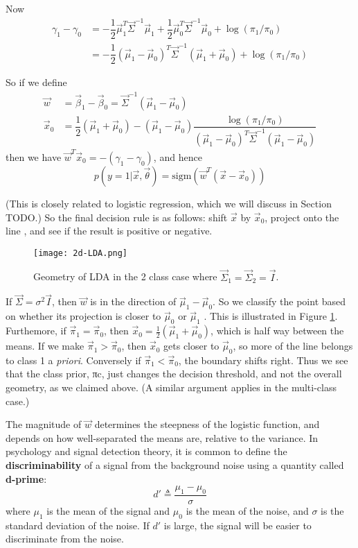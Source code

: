 Now
\begin{align}
\gamma_1-\gamma_0& = -\dfrac{1}{2}\vec{\mu}_1^T\vec{\Sigma}^{-1}\vec{\mu}_1+\dfrac{1}{2}\vec{\mu}_0^T\vec{\Sigma}^{-1}\vec{\mu}_0 + \log(\pi_1/\pi_0) \\
 & =-\dfrac{1}{2}(\vec{\mu}_1-\vec{\mu}_0)^T\vec{\Sigma}^{-1}(\vec{\mu}_1+\vec{\mu}_0)+ \log(\pi_1/\pi_0)
\end{align}

So if we define
\begin{align}
\vec{w}& =\vec{\beta}_1-\vec{\beta}_0=\vec{\Sigma}^{-1}(\vec{\mu}_1-\vec{\mu}_0) \\
\vec{x}_0& =\dfrac{1}{2}(\vec{\mu}_1+\vec{\mu}_0)-(\vec{\mu}_1-\vec{\mu}_0)\dfrac{\log(\pi_1/\pi_0)}{(\vec{\mu}_1-\vec{\mu}_0)^T\vec{\Sigma}^{-1}(\vec{\mu}_1-\vec{\mu}_0)}
\end{align}
then we have $\vec{w}^T\vec{x}_0=-(\gamma_1-\gamma_0)$, and hence
\begin{equation}
p(y=1|\vec{x},\vec{\theta})=\text{sigm}(\vec{w}^T(\vec{x}-\vec{x}_0))
\end{equation}

(This is closely related to logistic regression, which we will discuss in Section TODO.) So the final decision rule is as follows: shift $\vec{x}$ by $\vec{x}_0$, project onto the line , and see if the result is positive or negative.

\begin{figure}[hbtp]
\centering
    \texttt{[image: 2d-LDA.png]}
\caption{Geometry of LDA in the 2 class case where $\vec{\Sigma}_1=\vec{\Sigma}_2=\vec{I}$.}
\label{fig:2d-LDA} 
\end{figure}

If $\vec{\Sigma}=\sigma^2\vec{I}$, then $\vec{w}$ is in the direction of $\vec{\mu}_1-\vec{\mu}_0$. So we classify the point based on whether its projection is closer to $\vec{\mu}_0$ or $\vec{\mu}_1$ . This is illustrated in Figure \ref{fig:2d-LDA}. Furthemore, if $\vec{\pi}_1=\vec{\pi}_0$, then $\vec{x}_0=\frac{1}{2}(\vec{\mu}_1+\vec{\mu}_0)$, which is half way between the means. If we make $\vec{\pi}_1>\vec{\pi}_0$, then $\vec{x}_0$ gets closer to $\vec{\mu}_0$, so more of the line belongs to class 1 a \emph{priori}. Conversely if $\vec{\pi}_1<\vec{\pi}_0$, the boundary shifts right. Thus we see that the class prior, πc, just changes the decision threshold, and not the overall geometry, as we claimed above. (A similar argument applies in the multi-class case.)

The magnitude of $\vec{w}$ determines the steepness of the logistic function, and depends on how well-separated the means are, relative to the variance. In psychology and signal detection theory, it is common to define the \textbf{discriminability} of a signal from the background noise using a quantity called \textbf{d-prime}:
\begin{equation}
d' \triangleq \dfrac{\mu_1-\mu_0}{\sigma}
\end{equation}
where $\mu_1$ is the mean of the signal and $\mu_0$ is the mean of the noise, and $\sigma$ is the standard deviation of the noise. If $d'$ is large, the signal will be easier to discriminate from the noise.


